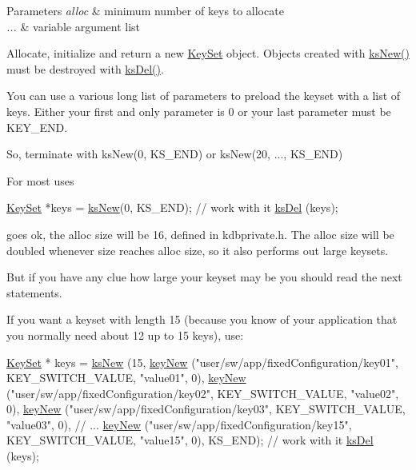 \begin{DoxyParams}{Parameters}
{\em alloc} & minimum number of keys to allocate \\
\hline
{\em ...} & variable argument list\\
\hline
\end{DoxyParams}
Allocate, initialize and return a new \hyperlink{classkdb_1_1KeySet}{Key\-Set} object.   Objects created with \hyperlink{group__keyset_ga671e1aaee3ae9dc13b4834a4ddbd2c3c}{ks\-New()} must be destroyed with \hyperlink{group__keyset_ga27e5c16473b02a422238c8d970db7ac8}{ks\-Del()}.

You can use a various long list of parameters to preload the keyset with a list of keys. Either your first and only parameter is 0 or your last parameter must be K\-E\-Y\-\_\-\-E\-N\-D.

So, terminate with ks\-New(0, K\-S\-\_\-\-E\-N\-D) or ks\-New(20, ..., K\-S\-\_\-\-E\-N\-D)

For most uses 
\begin{DoxyCode}
\hyperlink{classkdb_1_1KeySet_a4eac9850fa4f06c07a5306befc3e4377}{KeySet} *keys = \hyperlink{group__keyset_ga671e1aaee3ae9dc13b4834a4ddbd2c3c}{ksNew}(0, KS\_END);
\textcolor{comment}{// work with it}
\hyperlink{group__keyset_ga27e5c16473b02a422238c8d970db7ac8}{ksDel} (keys);
\end{DoxyCode}
 goes ok, the alloc size will be 16, defined in kdbprivate.\-h. The alloc size will be doubled whenever size reaches alloc size, so it also performs out large keysets.

But if you have any clue how large your keyset may be you should read the next statements.

If you want a keyset with length 15 (because you know of your application that you normally need about 12 up to 15 keys), use\-: 
\begin{DoxyCode}
\hyperlink{classkdb_1_1KeySet_a4eac9850fa4f06c07a5306befc3e4377}{KeySet} * keys = \hyperlink{group__keyset_ga671e1aaee3ae9dc13b4834a4ddbd2c3c}{ksNew} (15,
        \hyperlink{group__key_gad23c65b44bf48d773759e1f9a4d43b89}{keyNew} (\textcolor{stringliteral}{"user/sw/app/fixedConfiguration/key01"}, KEY\_SWITCH\_VALUE,
       \textcolor{stringliteral}{"value01"}, 0),
        \hyperlink{group__key_gad23c65b44bf48d773759e1f9a4d43b89}{keyNew} (\textcolor{stringliteral}{"user/sw/app/fixedConfiguration/key02"}, KEY\_SWITCH\_VALUE,
       \textcolor{stringliteral}{"value02"}, 0),
        \hyperlink{group__key_gad23c65b44bf48d773759e1f9a4d43b89}{keyNew} (\textcolor{stringliteral}{"user/sw/app/fixedConfiguration/key03"}, KEY\_SWITCH\_VALUE,
       \textcolor{stringliteral}{"value03"}, 0),
        \textcolor{comment}{// ...}
        \hyperlink{group__key_gad23c65b44bf48d773759e1f9a4d43b89}{keyNew} (\textcolor{stringliteral}{"user/sw/app/fixedConfiguration/key15"}, KEY\_SWITCH\_VALUE,
       \textcolor{stringliteral}{"value15"}, 0),
        KS\_END);
\textcolor{comment}{// work with it}
\hyperlink{group__keyset_ga27e5c16473b02a422238c8d970db7ac8}{ksDel} (keys);
\end{DoxyCode}


